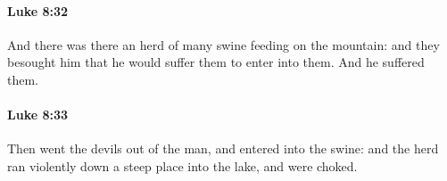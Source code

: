 		\paragraph{Luke 8:32} %
			\label{LUKE-8-32}

			And there was there an herd of many swine feeding on the mountain: and they besought him that he would suffer them to enter into them. And he suffered them.

			\begin{framed}
			\scriptsize
				\begin{compactdesc}
					\item[SBLG] 
				\end{compactdesc}
			\end{framed}

		\paragraph{Luke 8:33} %
			\label{LUKE-8-33}

			Then went the devils out of the man, and entered into the swine: and the herd ran violently down a steep place into the lake, and were choked.

